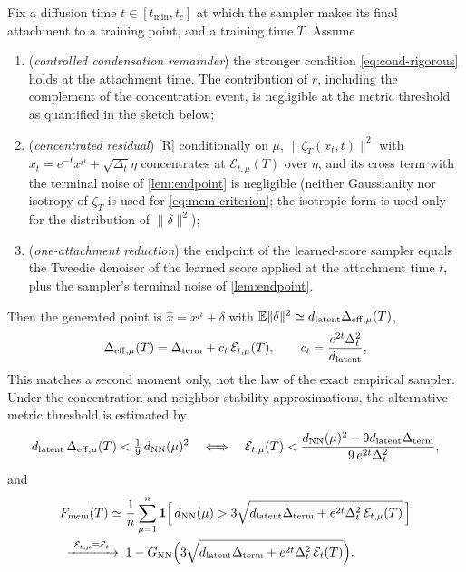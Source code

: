 \begin{proposition}\label{prop:bridge}
Fix a diffusion time $t\in[t_{\min},t_c]$ at which the sampler makes its final attachment to a training point, and a training time $T$. Assume
\begin{enumerate}
\item[(B1)] (\emph{controlled condensation remainder}) the stronger condition \eqref{eq:cond-rigorous} holds at the attachment time. The contribution of $r$, including the complement of the concentration event, is negligible at the metric threshold as quantified in the sketch below;
\item[(B2)] (\emph{concentrated residual}) [R] conditionally on $\mu$, $\|\zeta_T(x_t,t)\|^2$ with $x_t=e^{-t}x^\mu+\sqrt{\Delta_t}\eta$ concentrates at $\mathcal E_{t,\mu}(T)$ over $\eta$, and its cross term with the terminal noise of \cref{lem:endpoint} is negligible (neither Gaussianity nor isotropy of $\zeta_T$ is used for \eqref{eq:mem-criterion}; the isotropic form is used only for the distribution of $\|\delta\|^2$);
\item[(B3)] (\emph{one-attachment reduction}) the endpoint of the learned-score sampler equals the Tweedie denoiser of the learned score applied at the attachment time $t$, plus the sampler's terminal noise of \cref{lem:endpoint}.
\end{enumerate}
Then the generated point is $\hat x=x^\mu+\delta$ with $\mathbb{E}\|\delta\|^2\simeq d_{\mathrm{latent}}\Delta_{\rm eff,\mu}(T)$,
\begin{equation}\label{eq:Deff}
 \Delta_{\rm eff,\mu}(T)=\Delta_{\rm term}+c_t\,\mathcal E_{t,\mu}(T),\qquad c_t=\frac{e^{2t}\Delta_t^{2}}{d_{\mathrm{latent}}},
\end{equation}
This matches a second moment only, not the law of the exact empirical sampler. Under the concentration and neighbor-stability approximations, the alternative-metric threshold is estimated by
\begin{equation}\label{eq:mem-criterion}
 d_{\mathrm{latent}}\,\Delta_{\rm eff,\mu}(T)<\tfrac19\,d_{\rm NN}(\mu)^2\quad\Longleftrightarrow\quad \mathcal E_{t,\mu}(T)<\frac{d_{\rm NN}(\mu)^2-9d_{\mathrm{latent}}\Delta_{\rm term}}{9\,e^{2t}\Delta_t^{2}} ,
\end{equation}
and
\begin{equation}\label{eq:Fmem}
\begin{aligned}
&F_{\rm mem}(T)\simeq\frac1\nsamp\sum_{\mu=1}^{\nsamp}\mathbf 1\Big[\,d_{\rm NN}(\mu)>3\sqrt{\dlat\Delta_{\rm term}+e^{2t}\Delta_t^{2}\,\mathcal E_{t,\mu}(T)}\,\Big]\\ &\;\xrightarrow{\ \mathcal E_{t,\mu}\equiv\mathcal E_t\ }\;1-G_{\rm NN}\Big(3\sqrt{\dlat\Delta_{\rm term}+e^{2t}\Delta_t^{2}\,\mathcal E_t(T)}\Big).

\end{aligned}
\end{equation}
\end{proposition}
